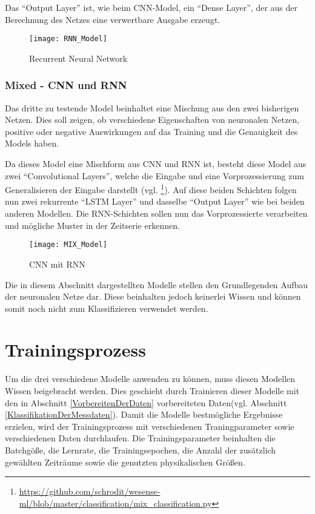     \noindent
    Das "`Output Layer"' ist, wie beim \ac{CNN}-Model, ein "`Dense Layer"', der aus der Berechnung des Netzes eine verwertbare Ausgabe erzeugt.

    \begin{figure}[H]
        \centering
        \texttt{[image: RNN\_Model]}
        \caption{Recurrent Neural Network \protect\cite{Tensorboard}}
        \label{fig:RNN_MODEL}
    \end{figure}

    \subsubsection{Mixed - CNN und RNN}
    Das dritte zu testende Model beinhaltet eine Mischung aus den zwei bisherigen Netzen. 
    Dies soll zeigen, ob verschiedene Eigenschaften von neuronalen Netzen, positive oder negative Auswirkungen auf das Training und die Genauigkeit des Models haben.
    \newline

    \noindent
    Da dieses Model eine Mischform aus \ac{CNN} und \ac{RNN} ist, besteht diese Model aus zwei "`Convolutional Layers"', welche die Eingabe und eine Vorprozessierung zum Generalisieren der Eingabe darstellt (vgl. \footnote{\url{https://github.com/schrodit/wesense-ml/blob/master/classification/mix_classification.py}}).
    Auf diese beiden Schichten folgen nun zwei rekurrente "`LSTM Layer"' und dasselbe "`Output Layer"' wie bei beiden anderen Modellen.
    Die \ac{RNN}-Schichten sollen nun das Vorprozessierte verarbeiten und mögliche Muster in der Zeitserie erkennen.     

    \begin{figure}[H]
        \centering
        \texttt{[image: MIX\_Model]}
        \caption{\ac{CNN} mit \ac{RNN} \protect\cite{Tensorboard}}
        \label{fig:MIX_MODEL}
    \end{figure}

    Die in diesem Abschnitt dargestellten Modelle stellen den Grundlegenden Aufbau der neuronalen Netze dar.
    Diese beinhalten jedoch keinerlei Wissen und können somit noch nicht zum Klassifizieren verwendet werden.    


\section{Trainingsprozess}
    Um die drei verschiedene Modelle anwenden zu können, muss diesen Modellen Wissen beigebracht werden.
    Dies geschieht durch Trainieren dieser Modelle mit den in Abschnitt \ref{VorbereitenDerDaten} vorbereiteten Daten(vgl. Abschnitt \ref{KlassifikationDerMessdaten}).
    Damit die Modelle bestmögliche Ergebnisse erzielen, wird der Trainingsprozess mit verschiedenen Traningparameter sowie verschiedenen Daten durchlaufen.
    Die Trainingsparameter beinhalten die Batchgöße, die Lernrate, die Trainingsepochen, die Anzahl der zusätzlich gewählten Zeiträume sowie die genutzten physikalischen Größen.
    \newline

